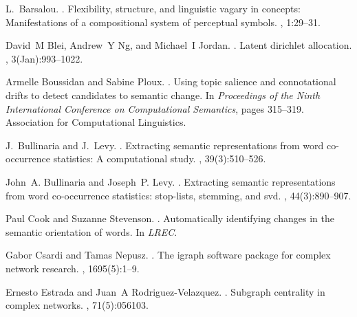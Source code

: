 \documentclass[11pt]{article}
\begin{document}
\begin{thebibliography}{}

L.~Barsalou.
.
\newblock Flexibility, structure, and linguistic vagary in concepts:
  Manifestations of a compositional system of perceptual symbols.
, 1:29--31.

David~M Blei, Andrew~Y Ng, and Michael~I Jordan.
.
\newblock Latent dirichlet allocation.
, 3(Jan):993--1022.

Armelle Boussidan and Sabine Ploux.
.
\newblock Using topic salience and connotational drifts to detect candidates to
  semantic change.
\newblock In {\em Proceedings of the Ninth International Conference on
  Computational Semantics}, pages 315--319. Association for Computational
  Linguistics.

J.~Bullinaria and J.~Levy.
.
\newblock Extracting semantic representations from word co-occurrence
  statistics: A computational study.
, 39(3):510--526.

John~A. Bullinaria and Joseph~P. Levy.
.
\newblock Extracting semantic representations from word co-occurrence
  statistics: stop-lists, stemming, and svd.
, 44(3):890--907.

Paul Cook and Suzanne Stevenson.
.
\newblock Automatically identifying changes in the semantic orientation of
  words.
\newblock In {\em LREC}.

Gabor Csardi and Tamas Nepusz.
.
\newblock The igraph software package for complex network research.
, 1695(5):1--9.

Ernesto Estrada and Juan~A Rodriguez-Velazquez.
.
\newblock Subgraph centrality in complex networks.
, 71(5):056103.


\end{thebibliography}
\end{document}
